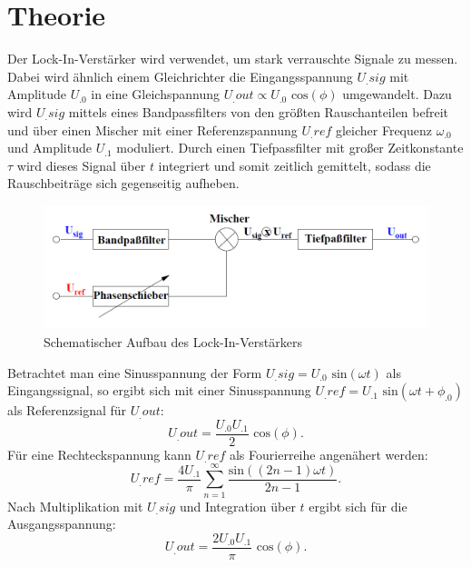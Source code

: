 
\section{Theorie}
\label{sec:Theorie}

Der Lock-In-Verstärker wird verwendet, um stark verrauschte Signale zu messen. Dabei wird ähnlich einem Gleichrichter die Eingangsspannung $U_.{sig}$ mit Amplitude $U_.0$ in eine Gleichspannung $U_.{out}\propto U_.0 \text{ cos}(\phi)$ umgewandelt. Dazu wird $U_.{sig}$ mittels eines Bandpassfilters von den größten Rauschanteilen befreit und über einen Mischer mit einer Referenzspannung $U_.{ref}$ gleicher Frequenz $\omega_.0$ und Amplitude $U_.1$ moduliert.
Durch einen Tiefpassfilter mit großer Zeitkonstante $\tau$ wird dieses Signal über $t$ integriert und somit zeitlich gemittelt, sodass die Rauschbeiträge sich gegenseitig aufheben.
\begin{figure}
	\centering
	\includegraphics[width=\linewidth-70pt,height=\textheight-70pt,keepaspectratio]{content/images/schematischerAufbau.png}
	\caption{Schematischer Aufbau des Lock-In-Verstärkers\cite{V303}}
	\label{fig:schematischerAufbau}
\end{figure}

\noindent Betrachtet man eine Sinusspannung der Form $U_.{sig}=U_.0 \text{ sin}(\omega t)$ als Eingangssignal, so ergibt sich mit einer Sinusspannung $U_.{ref}=U_.1 \text{ sin}(\omega t+\phi_.0)$ als Referenzsignal für $U_.{out}$:
\begin{equation}
U_.{out} = \frac{U_.0U_.1}{2} \text{ cos}(\phi)\text{.}
\end{equation}
Für eine Rechteckspannung kann $U_.{ref}$ als Fourierreihe angenähert werden:
\begin{equation}
U_.{ref} = \frac{4U_.1}{\pi}\sum_{n=1}^{\infty}\frac{\text{sin}((2n-1)\omega t)}{2n-1}\text{.}
\end{equation}
Nach Multiplikation mit $U_.{sig}$ und Integration über $t$ ergibt sich für die Ausgangsspannung:
\begin{equation}
U_.{out} = \frac{2U_.0U_.1}{\pi} \text{ cos}(\phi)\text{.}
\end{equation}
